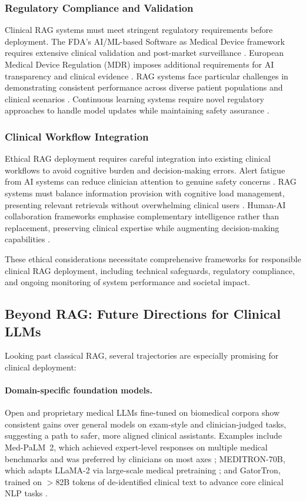 \subsubsection{Regulatory Compliance and Validation}
Clinical RAG systems must meet stringent regulatory requirements before deployment. The FDA's AI/ML-based Software as Medical Device framework requires extensive clinical validation and post-market surveillance \citep{fda2021artificial}. European Medical Device Regulation (MDR) imposes additional requirements for AI transparency and clinical evidence \citep{eu2017mdr}. RAG systems face particular challenges in demonstrating consistent performance across diverse patient populations and clinical scenarios \citep{sendak2020real}. Continuous learning systems require novel regulatory approaches to handle model updates while maintaining safety assurance \citep{scott2021regulation}.

\subsubsection{Clinical Workflow Integration}
Ethical RAG deployment requires careful integration into existing clinical workflows to avoid cognitive burden and decision-making errors. Alert fatigue from AI systems can reduce clinician attention to genuine safety concerns \citep{ancker2017effects}. RAG systems must balance information provision with cognitive load management, presenting relevant retrievals without overwhelming clinical users \citep{bates2003reducing}. Human-AI collaboration frameworks emphasise complementary intelligence rather than replacement, preserving clinical expertise while augmenting decision-making capabilities \citep{rajkomar2019machine}.

These ethical considerations necessitate comprehensive frameworks for responsible clinical RAG deployment, including technical safeguards, regulatory compliance, and ongoing monitoring of system performance and societal impact.
\newpage
\subsection{Beyond RAG: Future Directions for Clinical LLMs}

Looking past classical RAG, several trajectories are especially promising for clinical deployment:

\paragraph{Domain-specific foundation models.}
Open and proprietary medical LLMs fine-tuned on biomedical corpora show consistent gains over general models on exam-style and clinician-judged tasks, suggesting a path to safer, more aligned clinical assistants. Examples include Med-PaLM~2, which achieved expert-level responses on multiple medical benchmarks and was preferred by clinicians on most axes \citep{singhal2024medpalm2}; MEDITRON-70B, which adapts LLaMA-2 via large-scale medical pretraining \citep{chen2023meditron}; and GatorTron, trained on $>$82B tokens of de-identified clinical text to advance core clinical NLP tasks \citep{yang2022gatortron}.

